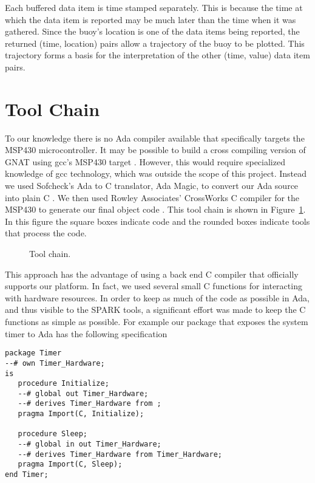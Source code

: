 \documentclass{sig-alternate}
\begin{document}
Each buffered data item is time stamped separately. This is because the time at which the data
item is reported may be much later than the time when it was gathered. Since the buoy's location
is one of the data items being reported, the returned (time, location) pairs allow a trajectory
of the buoy to be plotted. This trajectory forms a basis for the interpretation of the other
(time, value) data item pairs.

\section{Tool Chain}

To our knowledge there is no Ada compiler available that specifically targets the MSP430
microcontroller. It may be possible to build a cross compiling version of GNAT using gcc's
MSP430 target \cite{www:mspgcc}. However, this would require specialized knowledge of gcc
technology, which was outside the scope of this project. Instead we used Sofcheck's Ada to C
translator, Ada Magic, to convert our Ada source into plain C \cite{www:adamagic}. We then used
Rowley Associates' CrossWorks C compiler for the MSP430 to generate our final object code
\cite{www:crossworks}. This tool chain is shown in Figure~\ref{fig:tool-chain}. In this figure
the square boxes indicate code and the rounded boxes indicate tools that process the code.

\begin{figure}
\centering
\label{fig:tool-chain}
\caption{Tool chain.}
\end{figure}

This approach has the advantage of using a back end C compiler that officially supports our
platform. In fact, we used several small C functions for interacting with hardware resources. In
order to keep as much of the code as possible in Ada, and thus visible to the SPARK tools, a
significant effort was made to keep the C functions as simple as possible. For example our
package that exposes the system timer to Ada has the following specification

\begin{verbatim}
package Timer
--# own Timer_Hardware;
is
   procedure Initialize;
   --# global out Timer_Hardware;
   --# derives Timer_Hardware from ;
   pragma Import(C, Initialize);
      
   procedure Sleep;
   --# global in out Timer_Hardware;
   --# derives Timer_Hardware from Timer_Hardware;
   pragma Import(C, Sleep);
end Timer;
\end{verbatim}
\end{document}
